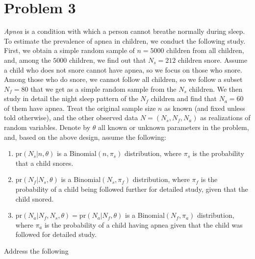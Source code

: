 \documentclass[letterpaper, 12pt]{article}
\newcommand{\pr}{\text{pr}}
\begin{document}
\section*{Problem 3}
\textit{Apnea} is a condition with which a person cannot breathe normally during sleep. To estimate the prevalence of apnea in children, we conduct the following study.
First, we obtain a simple random sample of $n = 5000$ children from all children, and, among the $5000$ children, we find out that $N_s = 212$ children snore. Assume a child who does not snore cannot have apnea, so we focus on those who snore. 
Among those who do snore, we cannot follow all children, so we follow a subset $N_f =80$ that we get as a simple random sample from the $N_s$ children. We then study in detail the night sleep pattern of the $N_f$ children and find that $N_a = 60$ of them have apnea.
Treat the original sample size $n$ as known (and fixed unless told otherwise), and the other observed data $N = (N_s, N_f , N_a)$ as realizations of random variables. 
Denote by $\theta$ all known or unknown parameters in the problem, and, based on the above design, assume the following:
\begin{enumerate}[(1)]
\item
$\pr(N_s | n, \theta)$ is a Binomial$(n, \pi_s)$ distribution, where $\pi_s$ is the probability that a child snores.
\item
$\pr(N_f | N_s, \theta)$ is a Binomial$(N_s, \pi_f)$ distribution, where $\pi_f$ is the probability of a child being followed
further for detailed study, given that the child snored.
\item
$\pr(N_a | N_f, N_s, \theta) = \pr(N_a | N_f, \theta)$ is a Binomial$ (N_f, \pi_a)$ distribution, where $\pi_a$ is the probability of a child having apnea given that the child was followed for detailed study.
\end{enumerate}
Address the following
\end{document}
